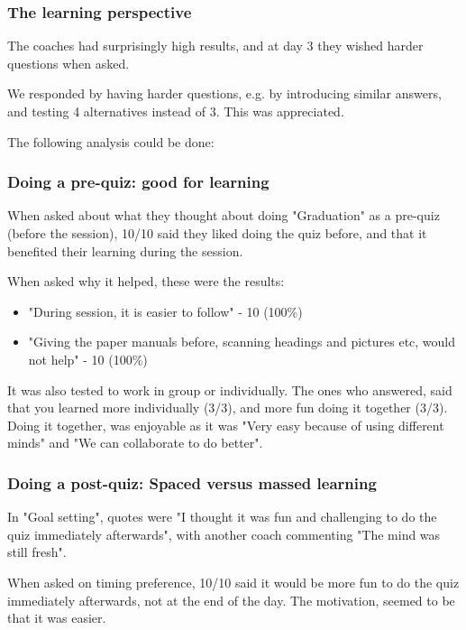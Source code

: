 \subsubsection{The learning perspective}

    The coaches had surprisingly high results, and at day 3 they wished harder questions when asked.

    We responded by having harder questions, e.g. by introducing similar answers, and testing 4 alternatives instead of 3. This was appreciated.

    The following analysis could be done:

    \subsubsection{Doing a pre-quiz: good for learning}
    When asked about what they thought about doing "Graduation" as a pre-quiz (before the session), 10/10 said they liked doing the quiz before, and that it benefited their learning during the session.

    When asked why it helped, these were the results:

    \begin{itemize}
    \item "During session, it is easier to follow" - 10 (100\%)
    \item "Giving the paper manuals before, scanning headings and pictures etc, would not help" - 10 (100\%)
    \end{itemize}

    It was also tested to work in group or individually. The ones who answered, said that you learned more individually (3/3), and more fun doing it together (3/3). Doing it together, was enjoyable as it was "Very easy because of using different minds" and "We can collaborate to do better".

    \subsubsection{Doing a post-quiz: Spaced versus massed learning}
    In "Goal setting", quotes were "I thought it was fun and challenging to do the quiz immediately afterwards", with another coach commenting "The mind was still fresh".

    When asked on timing preference, 10/10 said it would be more fun to do the quiz immediately afterwards, not at the end of the day. The motivation, seemed to be that it was easier.

